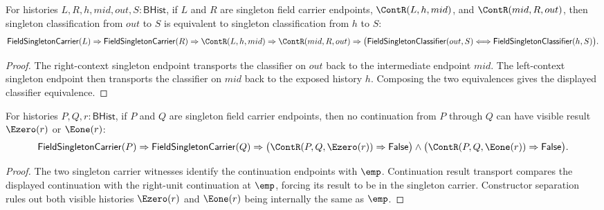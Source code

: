 \begin{theorem}
\label{thm:field-singleton-classifier-continuation-two-sided-context-transport-iff}
For histories $L,R,h,mid,out,S:\mathsf{BHist}$, if $L$ and $R$ are singleton
field carrier endpoints, $\ContR(L,h,mid)$, and $\ContR(mid,R,out)$, then
singleton classification from $out$ to $S$ is equivalent to singleton
classification from $h$ to $S$:
$$
\mathsf{FieldSingletonCarrier}(L)\Rightarrow
\mathsf{FieldSingletonCarrier}(R)\Rightarrow
\ContR(L,h,mid)\Rightarrow
\ContR(mid,R,out)\Rightarrow
\bigl(\mathsf{FieldSingletonClassifier}(out,S)\Longleftrightarrow
\mathsf{FieldSingletonClassifier}(h,S)\bigr).
$$
\end{theorem}
\begin{proof}
The right-context singleton endpoint transports the classifier on $out$ back
to the intermediate endpoint $mid$. The left-context singleton endpoint then
transports the classifier on $mid$ back to the exposed history $h$. Composing
the two equivalences gives the displayed classifier equivalence.
\end{proof}

\begin{theorem}
\label{thm:field-singleton-carrier-continuation-visible-result-absurd}
For histories $P,Q,r:\mathsf{BHist}$, if $P$ and $Q$ are singleton field
carrier endpoints, then no continuation from $P$ through $Q$ can have visible
result $\Ezero(r)$ or $\Eone(r)$:
$$
\mathsf{FieldSingletonCarrier}(P)\Rightarrow
\mathsf{FieldSingletonCarrier}(Q)\Rightarrow
\bigl(\ContR(P,Q,\Ezero(r))\Rightarrow\mathsf{False}\bigr)\land
\bigl(\ContR(P,Q,\Eone(r))\Rightarrow\mathsf{False}\bigr).
$$
\end{theorem}
\begin{proof}
The two singleton carrier witnesses identify the continuation endpoints with
$\emp$. Continuation result transport compares the displayed continuation with
the right-unit continuation at $\emp$, forcing its result to be in the
singleton carrier. Constructor separation rules out both visible histories
$\Ezero(r)$ and $\Eone(r)$ being internally the same as $\emp$.
\end{proof}

